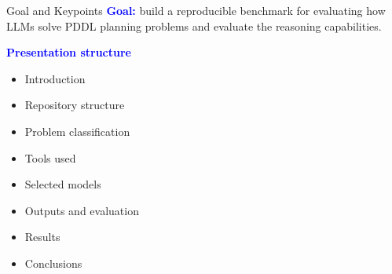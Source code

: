 \documentclass{beamer}
\begin{document}
\begin{frame}{Goal and Keypoints}\footnotesize
    \textcolor{blue}{\textbf{Goal:}} build a reproducible benchmark for evaluating how LLMs solve PDDL planning problems and evaluate the reasoning capabilities.

    \vspace{0.45cm}
    \textcolor{blue}{\textbf{Presentation structure}}
    \begin{itemize}
        \item Introduction
        \item Repository structure
        \item Problem classification
        \item Tools used
        \item Selected models
        \item Outputs and evaluation
        \item Results
        \item Conclusions
    \end{itemize}
\end{frame}
\end{document}
